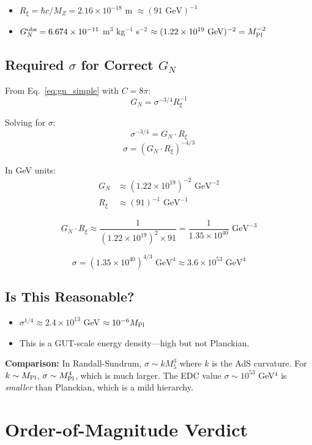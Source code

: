 \documentclass[11pt,a4paper]{article}
\begin{document}
\begin{itemize}
\item $R_\xi = \hbar c / M_Z = 2.16 \times 10^{-18}$ m $\approx (91 \text{ GeV})^{-1}$
\item $G_N^{\rm obs} = 6.674 \times 10^{-11}$ m$^3$ kg$^{-1}$ s$^{-2}$
$\approx (1.22 \times 10^{19} \text{ GeV})^{-2} = M_{\rm Pl}^{-2}$
\end{itemize}

\subsection{Required $\sigma$ for Correct $G_N$}

From Eq.~\eqref{eq:gn_simple} with $C = 8\pi$:
\[
G_N = \sigma^{-3/4} R_\xi^{-1}
\]

Solving for $\sigma$:
\[
\sigma^{-3/4} = G_N \cdot R_\xi
\]
\[
\sigma = (G_N \cdot R_\xi)^{-4/3}
\]

In GeV units:
\begin{align}
G_N &\approx (1.22 \times 10^{19})^{-2} \text{ GeV}^{-2} \\
R_\xi &\approx (91)^{-1} \text{ GeV}^{-1}
\end{align}

\[
G_N \cdot R_\xi \approx \frac{1}{(1.22 \times 10^{19})^2 \times 91}
= \frac{1}{1.35 \times 10^{40}} \text{ GeV}^{-3}
\]

\[
\sigma = (1.35 \times 10^{40})^{4/3} \text{ GeV}^4
\approx 3.6 \times 10^{53} \text{ GeV}^4
\]

\subsection{Is This Reasonable?}

\begin{itemize}
\item $\sigma^{1/4} \approx 2.4 \times 10^{13}$ GeV $\approx 10^{-6} M_{\rm Pl}$
\item This is a GUT-scale energy density---high but not Planckian.
\end{itemize}

\textbf{Comparison:} In Randall-Sundrum, $\sigma \sim k M_5^3$ where $k$
is the AdS curvature. For $k \sim M_{\rm Pl}$, $\sigma \sim M_{\rm Pl}^4$,
which is much larger. The EDC value $\sigma \sim 10^{53}$ GeV$^4$ is
\textit{smaller} than Planckian, which is a mild hierarchy.

\section{Order-of-Magnitude Verdict}
\end{document}
